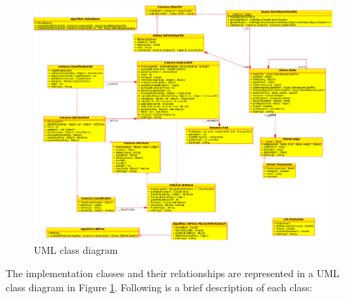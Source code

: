 \documentclass[10pt]{report}
\begin{document}
\begin{figure}
  \begin{center}
	\includegraphics[width=\textwidth,height=!]{uml}
  \end{center}
  \caption{UML class diagram}
  \label{fig:uml}
\end{figure} 

The implementation classes and their relationships are represented in a UML
class diagram in Figure \ref{fig:uml}. Following is a brief
description of each class:
\end{document}
